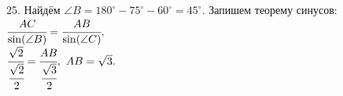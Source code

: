 25. Найдём $\angle B=180^\circ-75^\circ-60^\circ=45^\circ.$ Запишем теорему синусов: $\cfrac{AC}{\sin(\angle B)}=\cfrac{AB}{\sin(\angle C)},$\\$
\cfrac{\sqrt{2}}{\cfrac{\sqrt{2}}{2}}=\cfrac{AB}{\cfrac{\sqrt{3}}{2}},\ AB=\sqrt{3}.$\\
